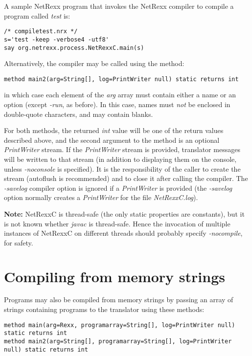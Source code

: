 {A sample NetRexx program that invokes the NetRexx compiler to compile a
program called \emph{test} is:
\begin{lstlisting}[label=compiletest,caption=Compiletest]
/* compiletest.nrx */
s='test -keep -verbose4 -utf8'
say org.netrexx.process.NetRexxC.main(s)
\end{lstlisting}

Alternatively, the compiler may be called using the method:
\begin{lstlisting}[label=array,caption=Calling with Array argument]
method main2(arg=String[], log=PrintWriter null) static returns int
\end{lstlisting}
in which case each element of the \emph{arg} array must contain
either a name or an option (except \emph{-run}, as before).  In this
case, names must \emph{not} be enclosed in double-quote characters, and
may contain blanks.

For both methods, the returned \emph{int} value will be one of the
return values described above, and the second argument to the method is
an optional \emph{PrintWriter} stream.  If the \emph{PrintWriter} stream
is provided, translator messages will be written to that stream (in
addition to displaying them on the console, unless \emph{-noconsole} is
specified).
It is the responsibility of the caller to create the stream (autoflush
is recommended) and to close it after calling the compiler.
The \emph{-savelog} compiler option is ignored if a \emph{PrintWriter}
is provided (the \emph{-savelog} option normally creates
a \emph{PrintWriter} for the file \emph{NetRexxC.log}).

\textbf{Note:} NetRexxC is thread-safe (the only static properties are constants), but
it is not known whether \emph{javac} is thread-safe.  Hence the
invocation of multiple instances of NetRexxC on different threads should
probably specify \emph{-nocompile}, for safety.

\section{Compiling from memory strings}
Programs may also be compiled from memory strings by passing an array
of strings containing programs to the translator using these methods:

\begin{lstlisting}[label=frommemory,caption=From Memory]
method main(arg=Rexx, programarray=String[], log=PrintWriter null) static returns int
method main2(arg=String[], programarray=String[], log=PrintWriter null) static returns int
\end{lstlisting}

}
